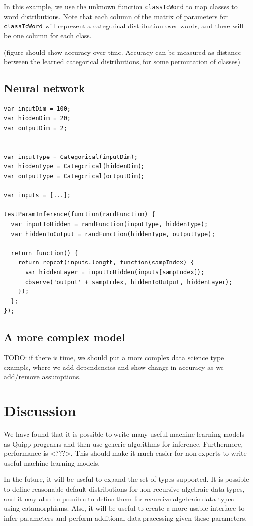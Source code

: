 \documentclass{article}
\begin{document}
In this example, we use the unknown function \texttt{classToWord} to map classes to word distributions.  Note that each column of the matrix of parameters for \texttt{classToWord} will represent a categorical distribution over words, and there will be one column for each class.

(figure should show accuracy over time.  Accuracy can be measured as distance between the learned categorical distributions, for some permutation of classes)

\subsection{Neural network}

{\small
\begin{verbatim}
var inputDim = 100;
var hiddenDim = 20;
var outputDim = 2;


var inputType = Categorical(inputDim);
var hiddenType = Categorical(hiddenDim);
var outputType = Categorical(outputDim);

var inputs = [...];

testParamInference(function(randFunction) {
  var inputToHidden = randFunction(inputType, hiddenType);
  var hiddenToOutput = randFunction(hiddenType, outputType);

  return function() {
    return repeat(inputs.length, function(sampIndex) {
      var hiddenLayer = inputToHidden(inputs[sampIndex]);
      observe('output' + sampIndex, hiddenToOutput, hiddenLayer);
    });
  };
});
\end{verbatim}
}

\subsection{A more complex model}

TODO: if there is time, we should put a more complex data science type example, where we add dependencies and show change in accuracy as we add/remove assumptions.


  \section{Discussion}

  We have found that it is possible to write many useful machine learning models as Quipp programs and then use generic algorithms for inference.  Furthermore, performance is <???>.  This should make it much easier for non-experts to write useful machine learning models.
  
  In the future, it will be useful to expand the set of types supported.  It is possible to define reasonable default distributions for non-recursive algebraic data types, and it may also be possible to define them for recursive algebraic data types using catamorphisms.  Also, it will be useful to create a more usable interface to infer parameters and perform additional data pracessing given these parameters.
\end{document}
